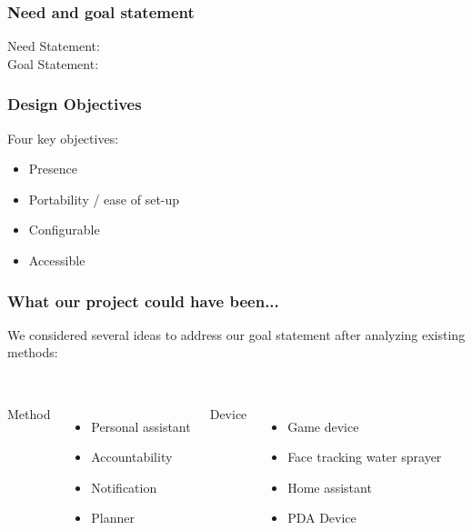 \documentclass{beamer}
\begin{document}
\frame{\titlepage}

\begin{frame}
  \frametitle{Need and goal statement}
  Need Statement:
   \\
  Goal Statement:
   \\
\end{frame}

\begin{frame}
  \frametitle{Design Objectives}
  Four key objectives:
  \begin{itemize}
    \item Presence
    \item Portability / ease of set-up
    \item Configurable
    \item Accessible
  \end{itemize}

\end{frame}

\begin{frame}
  \frametitle{What our project could have been...}
  We considered several ideas to address our goal statement after analyzing existing methods:
  \\~\\
  \begin{columns}
    Method
    \begin{itemize}
      \item Personal assistant
      \item Accountability
      \item Notification
      \item Planner
    \end{itemize}

    Device
    \begin{itemize}
      \item Game device
      \item Face tracking water sprayer
      \item Home assistant
      \item PDA Device
    \end{itemize}

  \end{columns}

\end{frame}
\end{document}
